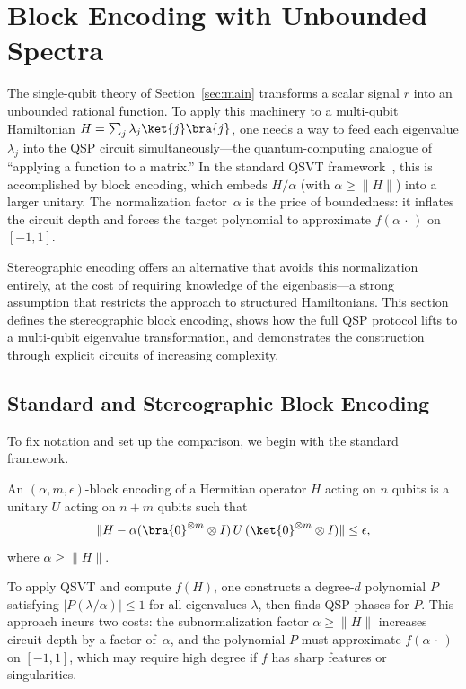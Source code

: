 \section{Block Encoding with Unbounded Spectra}
\label{sec:block-encoding}

The single-qubit theory of Section~\ref{sec:main} transforms a
scalar signal $r$ into an unbounded rational function.  To
apply this machinery to a multi-qubit Hamiltonian
$H = \sum_j \lambda_j\ket{j}\bra{j}$, one needs a way to
feed each eigenvalue $\lambda_j$ into the QSP circuit
simultaneously---the quantum-computing analogue of ``applying a
function to a matrix.''  In the standard QSVT
framework~\cite{GSLW2019}, this is accomplished by block
encoding, which embeds $H/\alpha$ (with $\alpha \geq \|H\|$)
into a larger unitary.  The normalization factor~$\alpha$
is the price of boundedness: it inflates the circuit depth and
forces the target polynomial to approximate $f(\alpha\,\cdot\,)$
on $[-1,1]$.

Stereographic encoding offers an alternative that avoids this
normalization entirely, at the cost of requiring knowledge of
the eigenbasis---a strong assumption that restricts the approach
to structured Hamiltonians.  This section defines the
stereographic block encoding, shows how the full QSP protocol
lifts to a multi-qubit eigenvalue transformation, and
demonstrates the construction through explicit circuits of
increasing complexity.

\subsection{Standard and Stereographic Block Encoding}
\label{subsec:block-encoding-defs}

To fix notation and set up the comparison, we begin with the
standard framework.

\begin{definition}
	An $(\alpha, m, \epsilon)$-block encoding of a Hermitian operator $H$ acting on $n$ qubits is a unitary $U$ acting on $n + m$ qubits such that
	\begin{equation}
		\|H - \alpha(\bra{0}^{\otimes m} \otimes I)\, U\, (\ket{0}^{\otimes m} \otimes I)\| \leq \epsilon,
	\end{equation}
	where $\alpha \geq \|H\|$.
\end{definition}

To apply QSVT and compute $f(H)$, one constructs a degree-$d$
polynomial $P$ satisfying $|P(\lambda/\alpha)| \leq 1$ for all
eigenvalues $\lambda$, then finds QSP phases for $P$.  This
approach incurs two costs: the subnormalization factor
$\alpha \geq \|H\|$ increases circuit depth by a factor
of~$\alpha$, and the polynomial $P$ must approximate
$f(\alpha\,\cdot\,)$ on $[-1,1]$, which may require high degree
if $f$ has sharp features or singularities.

